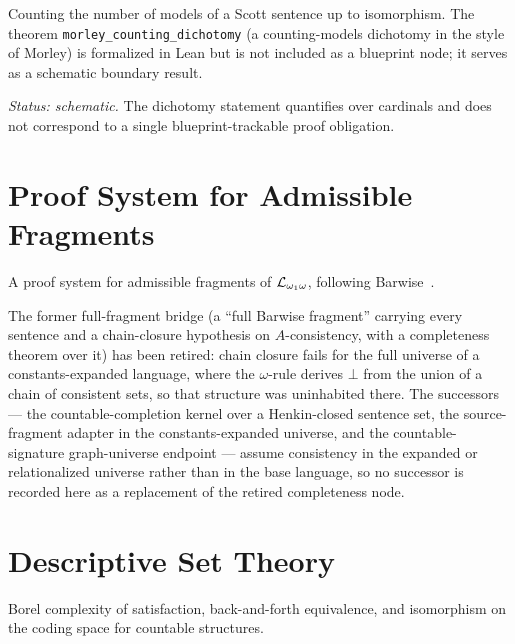 Counting the number of models of a Scott sentence up to isomorphism.
The theorem \texttt{morley\_counting\_dichotomy} (a counting-models
dichotomy in the style of Morley) is formalized in Lean but is not
included as a blueprint node; it serves as a schematic boundary result.

\emph{Status: schematic.}  The dichotomy statement quantifies over
cardinals and does not correspond to a single blueprint-trackable proof
obligation.



\chapter{Proof System for Admissible Fragments}

A proof system for admissible fragments of $\mathcal{L}_{\omega_1\omega}$, following Barwise~\cite{barwise1975}.




The former full-fragment bridge (a ``full Barwise fragment'' carrying every
sentence and a chain-closure hypothesis on $A$-consistency, with a completeness
theorem over it) has been retired: chain closure fails for the full universe of a
constants-expanded language, where the $\omega$-rule derives $\bot$ from the union
of a chain of consistent sets, so that structure was uninhabited there.  The
successors --- the countable-completion kernel over a Henkin-closed sentence set,
the source-fragment adapter in the constants-expanded universe, and the
countable-signature graph-universe endpoint --- assume consistency in the
expanded or relationalized universe rather than in the base language, so no
successor is recorded here as a replacement of the retired completeness node.

\chapter{Descriptive Set Theory}

Borel complexity of satisfaction, back-and-forth equivalence, and isomorphism
on the coding space for countable structures.



